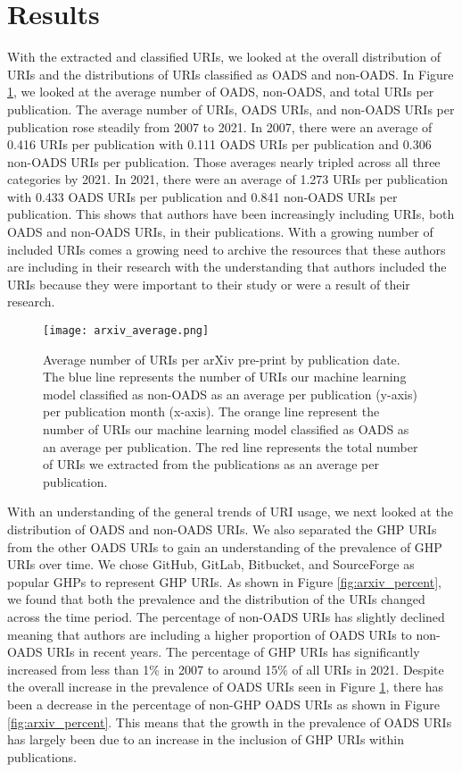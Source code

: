 \section{Results}
With the extracted and classified URIs, we looked at the overall distribution of URIs and the distributions of URIs classified as OADS and non-OADS. In Figure \ref{fig:arxiv_average}, we looked at the average number of OADS, non-OADS, and total URIs per publication. The average number of URIs, OADS URIs, and non-OADS URIs per publication rose steadily from 2007 to 2021. In 2007, there were an average of 0.416 URIs per publication with 0.111 OADS URIs per publication and 0.306 non-OADS URIs per publication. Those averages nearly tripled across all three categories by 2021. In 2021, there were an average of 1.273 URIs per publication with 0.433 OADS URIs per publication and 0.841 non-OADS URIs per publication. This shows that authors have been increasingly including URIs, both OADS and non-OADS URIs, in their publications. With a growing number of included URIs comes a growing need to archive the resources that these authors are including in their research with the understanding that authors included the URIs because they were important to their study or were a result of their research.

\begin{figure}
    \centering
    \texttt{[image: arxiv\_average.png]}
    \caption{Average number of URIs per arXiv pre-print by publication date. The blue line represents the number of URIs our machine learning model classified as non-OADS as an average per publication (y-axis) per publication month (x-axis). The orange line represent the number of URIs our machine learning model classified as OADS as an average per publication. The red line represents the total number of URIs we extracted from the publications as an average per publication.}
    \label{fig:arxiv_average}
\end{figure}

With an understanding of the general trends of URI usage, we next looked at the distribution of OADS and non-OADS URIs. We also separated the GHP URIs from the other OADS URIs to gain an understanding of the prevalence of GHP URIs over time. We chose GitHub, GitLab, Bitbucket, and SourceForge as popular GHPs to represent GHP URIs. As shown in Figure \ref{fig:arxiv_percent}, we found that both the prevalence and the distribution of the URIs changed across the time period. The percentage of non-OADS URIs has slightly declined meaning that authors are including a higher proportion of OADS URIs to non-OADS URIs in recent years. The percentage of GHP URIs has significantly increased from less than 1\% in 2007 to around 15\% of all URIs in 2021. Despite the overall increase in the prevalence of OADS URIs seen in Figure \ref{fig:arxiv_average}, there has been a decrease in the percentage of non-GHP OADS URIs as shown in Figure \ref{fig:arxiv_percent}. This means that the growth in the prevalence of OADS URIs has largely been due to an increase in the inclusion of GHP URIs within publications. 

